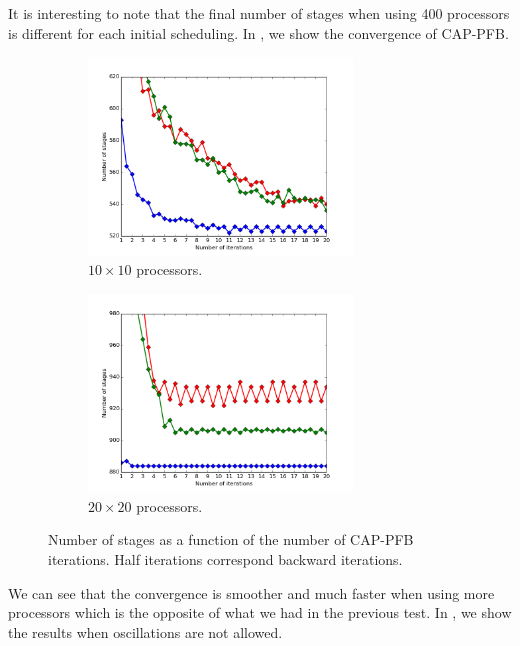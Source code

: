\documentclass[letterpaper]{article}
\renewcommand{\(}{\left(}
\renewcommand{\)}{\right)}
\renewcommand{\[}{\left[}
\renewcommand{\]}{\right]}
\begin{document}
It is interesting to note that the final number of stages when using 400
processors is different for each initial scheduling. In ,
we show the convergence of CAP-PFB. 

\begin{figure}[H]
  \begin{subfigure}[b]{.5\textwidth}
    \centering
    \includegraphics[width=7cm]{convergence_band_20_20}
    \caption{$10\times 10$ processors.}
  \end{subfigure}
  \begin{subfigure}[b]{.5\textwidth}
    \centering
    \includegraphics[width=7cm]{convergence_band_40_40}
    \caption{$20\times 20$ processors.}
  \end{subfigure}
  \caption{Number of stages as a function of the number of CAP-PFB iterations.
  Half iterations correspond backward iterations.}
  \label{convergence_band}
\end{figure}
 
We can see that the convergence is smoother and much faster when using more
processors which is the opposite of what we had in the previous test. In
, we show the results when oscillations are not allowed.
\end{document}
